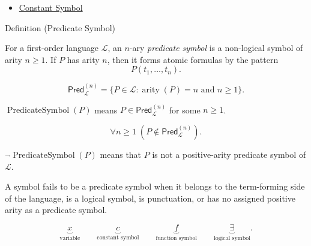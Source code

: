 \begin{dependencies}
\begin{itemize}
  \item \hyperref[def:constant-symbol]{Constant Symbol}
\end{itemize}
\end{dependencies}

\begin{definitionbox}{Definition (Predicate Symbol)}
\begin{definition}
\label{def:predicate-symbol}
For a first-order language \(\mathcal L\), an \(n\)-ary \emph{predicate symbol}
is a non-logical symbol of arity \(n\geq 1\). If \(P\) has arity \(n\), then it
forms atomic formulas by the pattern
\[
P(t_1,\ldots,t_n).
\]
\end{definition}
\end{definitionbox}

\begin{remark*}
\[
\mathsf{Pred}_{\mathcal L}^{(n)}
=
\{P\in\mathcal L : \operatorname{arity}(P)=n\text{ and }n\geq 1\}.
\]
\end{remark*}

\begin{remark*}
\(\operatorname{PredicateSymbol}(P)\) means
\(P\in\mathsf{Pred}_{\mathcal L}^{(n)}\) for some \(n\geq 1\).
\end{remark*}

\begin{remark*}
\[
\forall n\geq 1\;(P\notin\mathsf{Pred}_{\mathcal L}^{(n)}).
\]
\end{remark*}

\begin{remark*}
\(\neg\operatorname{PredicateSymbol}(P)\) means that \(P\) is not a positive-arity
predicate symbol of \(\mathcal L\).
\end{remark*}

\begin{remark*}
A symbol fails to be a predicate symbol when it belongs to the term-forming
side of the language, is a logical symbol, is punctuation, or has no assigned
positive arity as a predicate symbol.
\end{remark*}

\begin{remark*}
\[
\underbrace{x}_{\text{variable}}
\qquad
\underbrace{c}_{\text{constant symbol}}
\qquad
\underbrace{f}_{\text{function symbol}}
\qquad
\underbrace{\exists}_{\text{logical symbol}}.
\]
\end{remark*}


